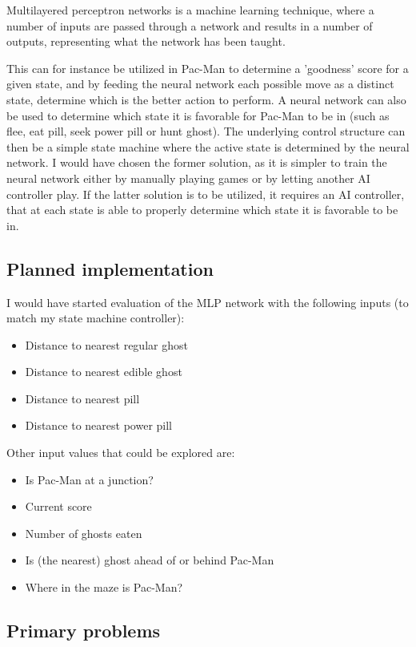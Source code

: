 \documentclass[conference]{IEEEtran}
\begin{document}
Multilayered perceptron networks is a machine learning technique, where a number of inputs are passed through a network and results in a number of outputs, representing what the network has been taught.

This can for instance be utilized in Pac-Man to determine a 'goodness' score for a given state, and by feeding the neural network each possible move as a distinct state, determine which is the better action to perform. A neural network can also be used to determine which state it is favorable for Pac-Man to be in (such as flee, eat pill, seek power pill or hunt ghost). The underlying control structure can then be a simple state machine where the active state is determined by the neural network. I would have chosen the former solution, as it is simpler to train the neural network either by manually playing games or by letting another AI controller play. If the latter solution is to be utilized, it requires an AI controller, that at each state is able to properly determine which state it is favorable to be in.

\subsection*{Planned implementation}

I would have started evaluation of the MLP network with the following inputs (to match my state machine controller):

\begin{itemize}
\item Distance to nearest regular ghost
\item Distance to nearest edible ghost
\item Distance to nearest pill
\item Distance to nearest power pill
\end{itemize}

Other input values that could be explored are:

\begin{itemize}
\item Is Pac-Man at a junction?
\item Current score
\item Number of ghosts eaten
\item Is (the nearest) ghost ahead of or behind Pac-Man
\item Where in the maze is Pac-Man?
\end{itemize}

\subsection*{Primary problems}
\end{document}
